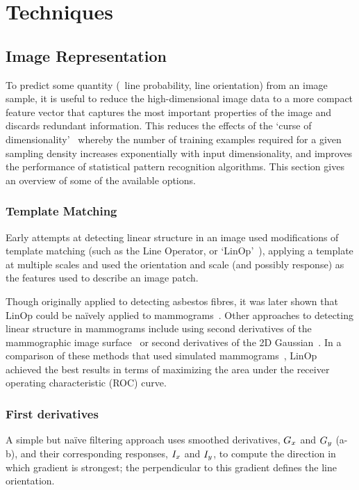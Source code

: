 \chapter{Techniques}

\section{Image Representation}
\label{s:filtering}
To predict some quantity (\eg~line probability, line orientation) from an image sample, it is useful to reduce the high-dimensional image data to a more compact feature vector that captures the most important properties of the image and discards redundant information. This reduces the effects of the `curse of dimensionality'~\cite{Bellman} whereby the number of training examples required for a given sampling density increases exponentially with input dimensionality, and improves the performance of statistical pattern recognition algorithms. This section gives an overview of some of the available options.

\subsection{Template Matching}
Early attempts at detecting linear structure in an image used modifications of template matching (such as the Line Operator, or `LinOp'~\cite{Dixon_Taylor_IPC79}), applying a template at multiple scales and used the orientation and scale (and possibly response) as the features used to describe an image patch. 

Though originally applied to detecting asbestos fibres, it was later shown that LinOp could be na\"ively applied to mammograms~\cite{Parr_etal_SPIE97}. Other approaches to detecting linear structure in mammograms include using second derivatives of the mammographic image surface~\cite{Cerneaz_Brady_CVVRRM95} or second derivatives of the 2D Gaussian~\cite{Karssemeijer_teBrake_TMI96}. In a comparison of these methods that used simulated mammograms~\cite{Zwiggelaar_etal_TMI04}, LinOp achieved the best results in terms of maximizing the area under the receiver operating characteristic (ROC) curve.


\subsection{First derivatives}
A simple but na\"ive filtering approach uses smoothed derivatives, $G_x$ and $G_y$ (a-b), and their corresponding responses, $I_x$ and $I_y$, to compute the direction in which gradient is strongest; the perpendicular to this gradient defines the line orientation.

